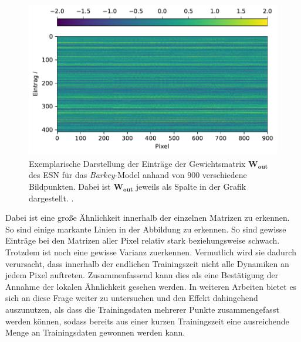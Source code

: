 \begin{figure}[h]
	\centering
	\includegraphics[height=2.7in]{figures/results/cross_prediction/weights.pdf}
	\setcapmargin[1cm]{1cm}
	\caption{Exemplarische Darstellung der Einträge der Gewichtsmatrix $\mathbf{W_{out}}$ des \textsc{ESN} für das \textit{Barkey}-Model anhand von $900$ verschiedene Bildpunkten. Dabei ist $\mathbf{W_{out}}$ jeweils als Spalte in der Grafik dargestellt.  .}
	\label{fig:exp_cross_esn_weights}
\end{figure}

Dabei ist eine große Ähnlichkeit innerhalb der einzelnen Matrizen zu erkennen. So sind einige markante Linien in der Abbildung zu erkennen. So sind gewisse Einträge bei den Matrizen aller Pixel relativ stark beziehungsweise schwach. Trotzdem ist noch eine gewisse Varianz zuerkennen. Vermutlich wird sie dadurch verursacht, dass innerhalb der endlichen Trainingszeit nicht alle Dynamiken an jedem Pixel auftreten. Zusammenfassend kann dies als eine Bestätigung der Annahme der lokalen Ähnlichkeit gesehen werden. In weiteren Arbeiten bietet es sich an diese Frage weiter zu untersuchen und den Effekt dahingehend auszunutzen, als dass die Trainingsdaten mehrerer Punkte zusammengefasst werden können, sodass bereits aus einer kurzen Trainingszeit eine ausreichende Menge an Trainingsdaten gewonnen werden kann.

\FloatBarrier
